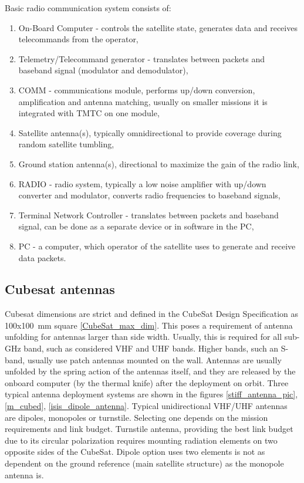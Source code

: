 Basic radio communication system consists of:
\begin{enumerate}
    \item On-Board Computer - controls the satellite state, generates data and receives telecommands from the operator,
    \item Telemetry/Telecommand generator - translates between packets and baseband signal (modulator and demodulator),
    \item COMM - communications module, performs up/down conversion, amplification and antenna matching, usually on smaller missions it is integrated with TMTC on one module,
    \item Satellite antenna(s), typically omnidirectional to provide coverage during random satellite tumbling,
    \item Ground station antenna(s), directional to maximize the gain of the radio link,
    \item RADIO - radio system, typically a low noise amplifier with up/down converter and modulator, converts radio frequencies to baseband signals,
    \item Terminal Network Controller - translates between packets and baseband signal, can be done as a separate device or in software in the PC,
    \item PC - a computer, which operator of the satellite uses to generate and receive data packets.
\end{enumerate}

\subsection{Cubesat antennas}
Cubesat dimensions are strict and defined in the CubeSat Design Specification \cite{cubesat_spec} as \si{100}x\si{100}~mm square \ref{CubeSat_max_dim}. This poses a requirement of antenna unfolding for antennas larger than side width. Usually, this is required for all sub-GHz band, such as considered VHF and UHF bands. Higher bands, such an S-band, usually use patch antennas mounted on the wall. 
Antennas are usually unfolded by the spring action of the antennas itself, and they are released by the onboard computer (by the thermal knife) after the deployment on orbit. Three typical antenna deployment systems are shown in the figures \ref{stiff_antenna_pic}, \ref{m_cubed}, \ref{isis_dipole_antenna}.
Typical unidirectional VHF/UHF antennas are dipoles, monopoles or turnstile. Selecting one depends on the mission requirements and link budget. Turnstile antenna, providing the best link budget due to its circular polarization requires mounting radiation elements on two opposite sides of the CubeSat. Dipole option uses two elements is not as dependent on the ground reference (main satellite structure) as the monopole antenna is.

